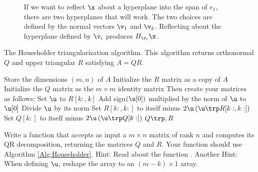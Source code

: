 \begin{figure}
\caption{If we want to reflect $\x$ about a hyperplane into the span of $e_1$, there are two hyperplanes that will work.
The two choices are defined by the normal vectors $\v_1$ and $\v_2$.
Reflecting about the hyperplane defined by $\v_i$ produces  $H_{\v_i}\x$.}
\label{fig:two reflectors}
\end{figure}

\begin{algorithm}
\caption{The Householder triangularization algorithm.
This algorithm returns orthonormal $Q$ and upper triangular $R$ satisfying $A = QR$.}
\label{Alg:Householder}
\begin{algorithmic}[1]
\State Store the dimensions $(m,n)$ of $A$
\State Initialize the $R$ matrix as a copy of $A$
\State Initialize the $Q$ matrix as the $m\times m$ identity matrix
\State Then create your matrices as follows:
    \State Set $\u$ to $R[k:,k]$
    \State Add sign$(\u[0])$ multiplied by the norm of $\u$ to $\u[0]$
    \State Divide $\u$ by its norm
    \State Set $R[k:,k:]$ to itself minus $2 \u \left(\u\trp R[k:,k:] \right)$
    \State Set $Q[k:]$ to itself minus $2 \u \left( \u\trp Q[k:] \right)$
\EndFor
\State {} $Q\trp, R$
\EndProcedure
\end{algorithmic}
\end{algorithm}


\begin{problem} %
Write a function that accepts as input a $m \times n$ matrix of rank $n$ and computes its QR decomposition, returning the matrices $Q$ and $R$.
Your function should use Algorithm \ref{Alg:Householder}.
Hint: Read about the function .  Another Hint: When defining $\u$, reshape the array to an $(m-k) \times 1$ array.
\end{problem}

